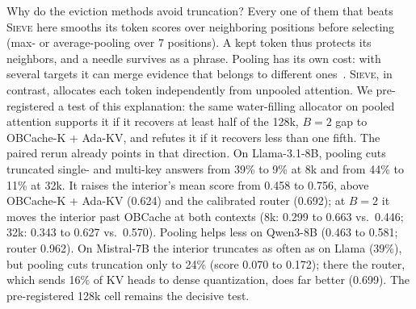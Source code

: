 \documentclass{article}
\newif\ifshowtbd \showtbdtrue
\newcommand{\tbd}[1]{\ifshowtbd{\color{tbdcol}\textbf{TBD}~#1}\else\ifhmode\unskip\fi\fi}
\newif\ifshowest \showesttrue
\DeclareRobustCommand{\est}[1]{\ifshowest{\color{estcol}#1}\else---\fi}
\DeclareRobustCommand{\estonly}[1]{\ifshowest#1\else\ifhmode\unskip\fi\fi}
\newcommand{\sieve}{\textsc{Sieve}}
\theoremstyle{definition}
\begin{document}
Why do the eviction methods avoid truncation?  Every one of them that beats \sieve{} here smooths its token scores over neighboring positions before selecting (max- or average-pooling over 7 positions).  A kept token thus protects its neighbors, and a needle survives as a phrase.  Pooling has its own cost: with several targets it can merge evidence that belongs to different ones~\citep{zhang2026fixedcontract}.  \sieve{}, in contrast, allocates each token independently from unpooled attention.  We pre-registered a test of this explanation: the same water-filling allocator on pooled attention supports it if it recovers at least half of the 128k, $B=2$ gap to OBCache-K + Ada-KV, and refutes it if it recovers less than one fifth.  The paired rerun already points in that direction.  On Llama-3.1-8B, pooling cuts truncated single- and multi-key answers from 39\% to 9\% at 8k and from 44\% to 11\% at 32k.  It raises the interior's mean score from 0.458 to 0.756, above OBCache-K + Ada-KV (0.624) and the calibrated router (0.692); at $B=2$ it moves the interior past OBCache at both contexts (8k: 0.299 to 0.663 vs.\ 0.446; 32k: 0.343 to 0.627 vs.\ 0.570).  Pooling helps less on Qwen3-8B (0.463 to 0.581; router 0.962).  On Mistral-7B the interior truncates as often as on Llama (39\%), but pooling cuts truncation only to 24\% (score 0.070 to 0.172); there the router, which sends 16\% of KV heads to dense quantization, does far better (0.699).  The pre-registered 128k cell remains the decisive test.
\end{document}
